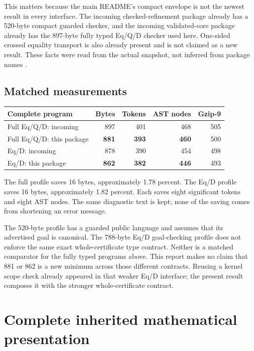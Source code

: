 \documentclass[11pt]{article}
\theoremstyle{definition}\newtheorem{definition}[theorem]{Definition}
\theoremstyle{remark}\newtheorem{remark}[theorem]{Remark}
\begin{document}
This matters because the main README's compact envelope is not the newest
result in every interface. The incoming checked-refinement package already
has a 520-byte compact guarded checker, and the incoming validated-core
package already has the 897-byte fully typed Eq/Q/D checker used here.
One-sided crossed equality transport is also already present and is not
claimed as a new result. These facts were read from the actual snapshot,
not inferred from package names \cite{readme,validated,checked,onesided}.

\subsection{Matched measurements}

\begin{center}
\begin{tabular}{@{}lrrrr@{}}
\toprule
Complete program & Bytes & Tokens & AST nodes & Gzip-9\\
\midrule
Full Eq/Q/D: incoming & 897 & 401 & 468 & 505\\
Full Eq/Q/D: this package & \textbf{881} & \textbf{393} & \textbf{460} & 500\\
Eq/D: incoming & 878 & 390 & 454 & 498\\
Eq/D: this package & \textbf{862} & \textbf{382} & \textbf{446} & 493\\
\bottomrule
\end{tabular}
\end{center}

The full profile saves 16 bytes, approximately 1.78 percent. The Eq/D
profile saves 16 bytes, approximately 1.82 percent. Each saves eight
significant tokens and eight AST nodes. The same diagnostic text is kept;
none of the saving comes from shortening an error message.

The 520-byte profile has a guarded public language and assumes that its
advertised goal is canonical. The 788-byte Eq/D goal-checking profile
does not enforce the same exact whole-certificate type contract. Neither
is a matched comparator for the fully typed programs above. This report
makes no claim that 881 or 862 is a new minimum across those different
contracts. Reusing a kernel scope check already appeared in that weaker
Eq/D interface; the present result composes it with the stronger
whole-certificate contract.

\section{Complete inherited mathematical presentation}
\label{sec:presentation}
\end{document}
